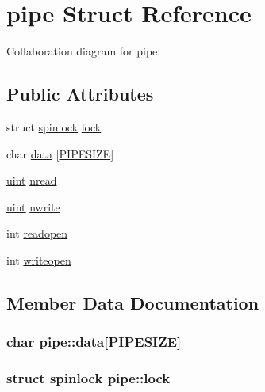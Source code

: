 \hypertarget{structpipe}{}\section{pipe Struct Reference}
\label{structpipe}


Collaboration diagram for pipe\+:
\subsection*{Public Attributes}
\begin{DoxyCompactItemize}
\item 
struct \hyperlink{structspinlock}{spinlock} \hyperlink{structpipe_a0ce399a2ba316d11cb8e678069bfd5b4}{lock}
\item 
char \hyperlink{structpipe_ab02ae9fa0b8b092512c28c7c080f0c7b}{data} \mbox{[}\hyperlink{pipe_8c_ad3dc9214a710d7a6c516cbaa2a12a1de}{P\+I\+P\+E\+S\+I\+ZE}\mbox{]}
\item 
\hyperlink{custom__types_8h_a91ad9478d81a7aaf2593e8d9c3d06a14}{uint} \hyperlink{structpipe_ad71eb56c445f9178dac07ae47f352fd1}{nread}
\item 
\hyperlink{custom__types_8h_a91ad9478d81a7aaf2593e8d9c3d06a14}{uint} \hyperlink{structpipe_a419b6fc2780013358de51c91371dac66}{nwrite}
\item 
int \hyperlink{structpipe_a7bdc57b39ef97dda61e468ad9e8dbfba}{readopen}
\item 
int \hyperlink{structpipe_a9538da698ddd63615c991a318094663b}{writeopen}
\end{DoxyCompactItemize}


\subsection{Member Data Documentation}
\subsubsection[{\texorpdfstring{data}{data}}]{\setlength{\rightskip}{0pt plus 5cm}char pipe\+::data\mbox{[}{\bf P\+I\+P\+E\+S\+I\+ZE}\mbox{]}}\hypertarget{structpipe_ab02ae9fa0b8b092512c28c7c080f0c7b}{}\label{structpipe_ab02ae9fa0b8b092512c28c7c080f0c7b}
\subsubsection[{\texorpdfstring{lock}{lock}}]{\setlength{\rightskip}{0pt plus 5cm}struct {\bf spinlock} pipe\+::lock}\hypertarget{structpipe_a0ce399a2ba316d11cb8e678069bfd5b4}{}\label{structpipe_a0ce399a2ba316d11cb8e678069bfd5b4}
